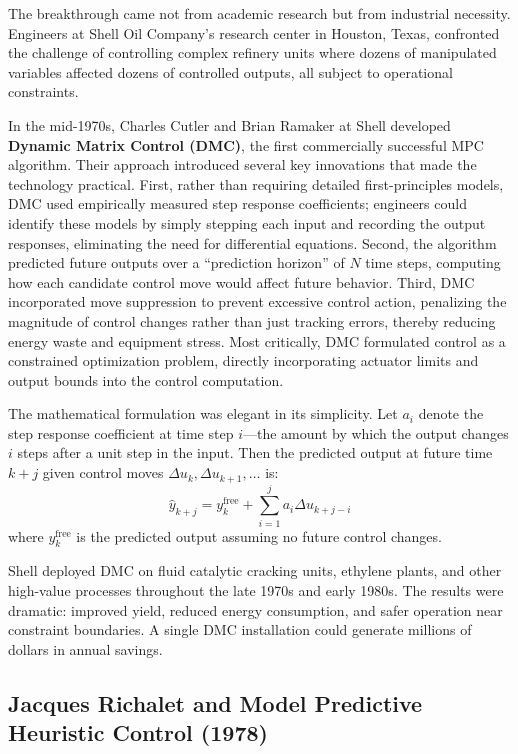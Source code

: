 The breakthrough came not from academic research but from industrial necessity. Engineers at Shell Oil Company's research center in Houston, Texas, confronted the challenge of controlling complex refinery units where dozens of manipulated variables affected dozens of controlled outputs, all subject to operational constraints.

In the mid-1970s, Charles Cutler and Brian Ramaker at Shell developed \textbf{Dynamic Matrix Control (DMC)}, the first commercially successful MPC algorithm. Their approach introduced several key innovations that made the technology practical. First, rather than requiring detailed first-principles models, DMC used empirically measured step response coefficients; engineers could identify these models by simply stepping each input and recording the output responses, eliminating the need for differential equations. Second, the algorithm predicted future outputs over a ``prediction horizon'' of $N$ time steps, computing how each candidate control move would affect future behavior. Third, DMC incorporated move suppression to prevent excessive control action, penalizing the magnitude of control changes rather than just tracking errors, thereby reducing energy waste and equipment stress. Most critically, DMC formulated control as a constrained optimization problem, directly incorporating actuator limits and output bounds into the control computation.

The mathematical formulation was elegant in its simplicity. Let $a_i$ denote the step response coefficient at time step $i$---the amount by which the output changes $i$ steps after a unit step in the input. Then the predicted output at future time $k+j$ given control moves $\Delta u_k, \Delta u_{k+1}, \ldots$ is:
\begin{equation}
    \hat{y}_{k+j} = y_k^{\text{free}} + \sum_{i=1}^{j} a_i \Delta u_{k+j-i}
\end{equation}
where $y_k^{\text{free}}$ is the predicted output assuming no future control changes.

Shell deployed DMC on fluid catalytic cracking units, ethylene plants, and other high-value processes throughout the late 1970s and early 1980s. The results were dramatic: improved yield, reduced energy consumption, and safer operation near constraint boundaries. A single DMC installation could generate millions of dollars in annual savings.

\subsection{Jacques Richalet and Model Predictive Heuristic Control (1978)}

